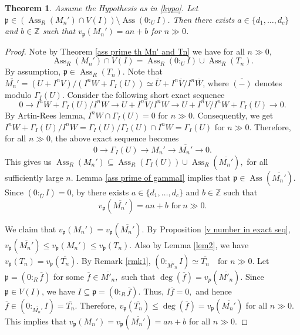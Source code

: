 \documentclass[11pt,reqno]{amsart}
\newtheorem{theorem}{Theorem}[section]
\theoremstyle{definition}
\newcommand{\p}{\mathfrak{p}}
\newcommand{\Z}{\mathbb{Z}}
\newcommand{\Ass}{\operatorname{Ass}}
\begin{document}
\begin{theorem}\label{if p is not ass prime of 0 collon I}
    Assume the Hypothesis as in \ref{hypo}. Let $\p\in  \left(\Ass_R(M_n')\cap V(I)\right)\setminus \Ass (0:_UI)$. Then there exists $a\in\{d_1,\ldots,d_c\}$ and $b\in \Z$ such that $v_{\p}(M_n')=a n+b$ for $n\gg 0$.
\end{theorem}
\begin{proof}
    Note by Theorem \ref{ass prime th Mn' and Tn} we have for all $n\gg0,$ $$\Ass_R (M_n')\cap V(I)=\Ass_R (0:_U I)\cup\Ass_R (T_n).$$ 
    By assumption, $\p \in \Ass_R (T_n)$. Note that $\overline{M_n'}=(U+I^nV)/(I^nW+\Gamma_I(U))\simeq \overline{U}+I^n{\overline{V}}/I^n{\overline{W}}$, where $\overline{(-)}$ denotes modulo $\Gamma_I(U)$. Consider the following short exact sequence 
    \begin{equation*}
        0\to I^nW+\Gamma_I(U)/I^nW\to U+I^nV/I^nW\to U+I^nV/I^nW+\Gamma_I(U)\to 0.
    \end{equation*}
    By Artin-Rees lemma, $I^n W\cap \Gamma_I(U)=0$ for $n\gg 0$. Consequently, we get $I^nW+\Gamma_I(U)/I^nW=\Gamma_I(U)/\Gamma_I(U)\cap I^nW=\Gamma_I(U)$ for $n\gg 0$. Therefore, for all $n\gg0$, the above exact sequence becomes 
    \begin{equation}\label{equation of Mn and Mn'}
        0\to \Gamma_I(U)\to M_n'\to \overline{M_n'}\to 0.
    \end{equation}
    This gives us $\Ass_R (M_n')\subseteq \Ass_R(\Gamma_I(U))\cup \Ass_R (\overline{M_n'}),$  for all sufficiently large $n$. Lemma \ref{ass prime of gammaI} implies that $\p\in \Ass (\overline{M_n'})$. Since $(0:_{\overline{U}}I)=0$, by \cite[Theorem 3.8]{GP25}  there exists $a\in\{d_1,\ldots,d_c\}$ and $b\in \Z$  such that
    $$v_{\p} (\overline{M_n'})=a n+b   \text{ for}\ n\gg 0.$$

    We claim that $v_{\p} (M_n')=v_{\p} (\overline{M_n'}).$ By Proposition \ref{v number in exact seq}, $v_{\p} (\overline{M_n'})\leq v_{\p} (M_n')\leq v_{\p} (T_n)  .$
    Also by Lemma \ref{lem2}, we have $v_{\p} (T_n)=v_{\p} (\overline{ T_n})$. By Remark \ref{rmk1}, $(0:_{\overline{M'_n}} I)\simeq \overline{T_n} \quad \text{for $n\gg 0$}.$ Let
$\p = (0:_R \overline{f}) $ for some $\overline{f}\in\overline{M'_n},$ such that $
\deg(\overline{f})=v_{p}(\overline{M'_n}).$ Since $\p \in V(I)$, we have $I\subseteq{\p}=(0:_R\overline{f}).$ Thus, $I\overline{f}=0,$ and hence
$\overline{f}\in(0:_{\overline{M_n'}}I)=\overline{T_n}.$
Therefore, $v_{\p}(\overline{T_n})\leq \deg(\overline{f})
=v_{\p}(\overline{M_n'})$ for all $n\gg 0$. This implies that $v_{\p}(M_n')=v_{\p}(\overline{M_n'})=an+b$ for all $n\gg0.$ 
\end{proof}
\end{document}
